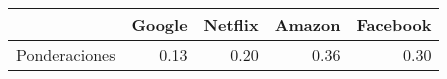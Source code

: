 \begin{table}[ht]
\centering
\begin{tabular}{rrrrr}
  \hline
 & Google & Netflix & Amazon & Facebook \\ 
  \hline
Ponderaciones & 0.13 & 0.20 & 0.36 & 0.30 \\ 
   \hline
\end{tabular}
\end{table}
